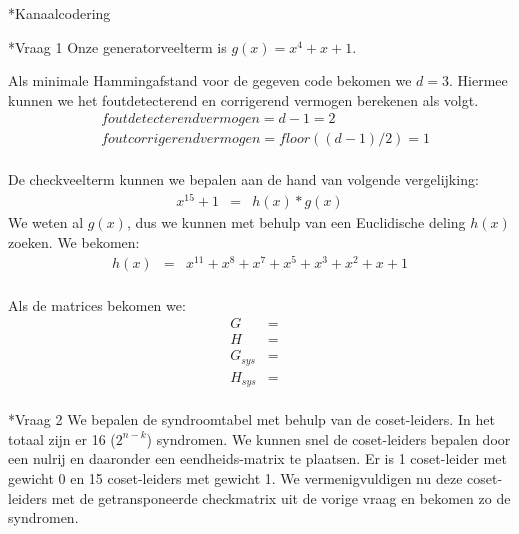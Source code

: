 \documentclass[]{article}
\begin{document}
\begin{section}
\begin{subsection}
   	\end{subsection}

\end{section}

\begin{section}*{Kanaalcodering}
	\begin{subsection}*{Vraag 1}
		Onze generatorveelterm is $g(x) = x^4 + x + 1$.
		
        Als minimale Hammingafstand voor de gegeven code bekomen we $d=3$. 
        Hiermee kunnen we het foutdetecterend en corrigerend vermogen berekenen als volgt.
        \begin{eqnarray*}
        	& foutdetecterend vermogen = d-1 = 2 \\
        	& foutcorrigerend vermogen = floor((d-1)/2) = 1 \\
        \end{eqnarray*}        
        
        De checkveelterm kunnen we bepalen aan de hand van volgende vergelijking:
        \begin{eqnarray*}
        	x^{15} + 1 &=& h(x) * g(x)
        \end{eqnarray*}
        We weten al $g(x)$, dus we kunnen met behulp van een Euclidische deling $h(x)$ 
        zoeken. We bekomen:
        \begin{eqnarray*}
        	h(x) &=& x^{11} + x^8 + x^7 + x^5 + x^3 + x^2 + x + 1 \\
        \end{eqnarray*}
        
        Als de matrices bekomen we:
        \begin{eqnarray*}
        G &=&\\
        H &=&\\
        G_{sys} &=&\\
        H_{sys} &=&\\
        \end{eqnarray*}

   	\end{subsection}

    \begin{subsection}*{Vraag 2} %
    	We bepalen de syndroomtabel met behulp van de coset-leiders. In het totaal zijn er 16 ($2^{n-k}$) syndromen. We kunnen 	
    	snel de coset-leiders bepalen door een nulrij en daaronder een eendheids-matrix te plaatsen. Er is 1 coset-leider met 
    	gewicht 0 en 15 coset-leiders  met gewicht 1. We vermenigvuldigen nu deze coset-leiders met de getransponeerde checkmatrix uit de vorige vraag en bekomen zo de syndromen.\\
    

\end{subsection}
\end{section}
\end{document}
